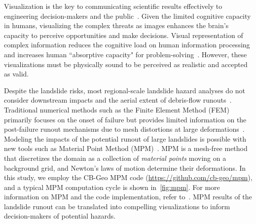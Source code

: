 \documentclass[journal]{IEEEtran}
\begin{document}
Visualization is the key to communicating scientific results effectively to engineering decision-makers and the public~\cite{mayer2005cognitive}. Given the limited cognitive capacity in humans, visualizing the complex threats as images enhances the brain's capacity to perceive opportunities and make decisions. Visual representation of complex information reduces the cognitive load on human information processing and increases human ``absorptive capacity" for problem-solving~\cite{kahneman2012human}. However, these visualizations must be physically sound to be perceived as realistic and accepted as valid.

Despite the landslide risks, most regional-scale landslide hazard analyses do not consider downstream impacts and the aerial extent of debris-flow runouts~\cite{USGS2017debris}. Traditional numerical methods such as the Finite Element Method (FEM) primarily focuses on the onset of failure but provides limited information on the post-failure runout mechanisms due to mesh distortions at large  deformations~\cite{soga2016trends}. Modeling the impacts of the potential runout of large landslides is possible with new tools such as Material Point Method (MPM)~\cite{Bardenhagen2000,Bardenhagen2004,Sulsky1994,Sulsky1995}. MPM is a mesh-free method that discretizes the domain as a collection of \textit{material points} moving on a background grid, and Newton's laws of motion determine their deformations. In this study, we employ the CB-Geo MPM code (\url{https://github.com/cb-geo/mpm}), and a typical MPM computation cycle is shown in~\cref{fig:mpm}. For more information on MPM and the code implementation, refer to~\cite{kumar2019scalable}. MPM results of the landslide runout can be translated into compelling visualizations to inform decision-makers of potential hazards. 
\end{document}
